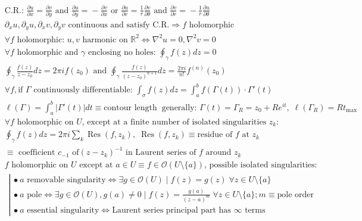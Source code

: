 \begin{align*}
&\text{C.R.: }\frac{\partial u}{\partial x}\!=\!\frac{\partial v}{\partial y}\text{ and }\frac{\partial u}{\partial y}\!=\!-\frac{\partial v}{\partial x}\text{ or }\frac{\partial u}{\partial r}\!=\!\frac{1}{r}\frac{\partial v}{\partial\theta}\text{ and }\frac{\partial v}{\partial r}\!=\!-\frac{1}{r}\frac{\partial u}{\partial\theta} \\
&\partial_x u,\partial_y u,\partial_x v,\partial_y v\text{ continuous and satisfy C.R.}\Rightarrow f\text{ holomorphic} \\
&\forall f\text{ holomorphic: }u,v\text{ harmonic on $\mathbb{R}^2$}\Leftrightarrow\nabla^2u\!=\!0,\nabla^2v\!=\!0 \\
&\forall f\text{ holomorphic and $\gamma$ enclosing no holes: }\oint_\gamma\!f(z)dz\!=\!0 \\
&\oint_\gamma\!\frac{f(z)}{z\!-\!z_0}dz\!=\!2\pi if(z_0)\text{ and }\oint_\gamma\!\frac{f(z)}{(z\!-\!z_0)^{n+1}}dz\!=\!\frac{2\pi i}{n!}f^{(n)}(z_0) \\
&\forall f,\text{if $\Gamma$ continuously differentiable: }\int_\sigma\!f(z)dz\!\!=\!\!\int_a^b\!f(\Gamma(t))\cdot\Gamma'(t) \\
&\ell(\Gamma)\!=\!\int_a^b\!|\Gamma'(t)|dt\!\equiv\!\text{contour length}\;\;\text{generally: }\!\Gamma(t)\!=\!\Gamma_R\!=\!z_0\!+\!Re^{it},\;\ell(\Gamma_R)\!=\!Rt_{\text{max}} \\
&\text{$\forall f$ holomorphic on $U$, except at a finite number of isolated singularities $z_k$:} \\
&\oint_\gamma\!f(z)dz\!=\!2\pi i\sum_k\operatorname{Res}(f,z_k),\;\operatorname{Res}(f,z_k)\!\equiv\!\text{residue of $f$ at }z_k \\
&\equiv \text{ coefficient } c_{-1} \text{ of} (z-z_k)^{-1} \text{ in Laurent series of $f$ around }z_k \\
&\text{$f$ holomorphic on $U$ except at $a \! \in \! U  \!\equiv \! f \!\in \!\mathcal{O}(U\!\setminus\!\{a\})$, possible isolated singularities:} \\
&\hspace{5pt}\left|\!\!\!
\begin{array}{l}
\bullet\ a\text{ removable singularity}\Leftrightarrow\exists g\in\mathcal{O}(U)\mid f(z)\!=\!g(z)\;\forall z\in U\setminus\{a\} \\
\bullet\ a\text{ pole}\Leftrightarrow\exists g\in\mathcal{O}(U),g(a)\!\neq\!0\mid f(z)\!=\!\frac{g(a)}{(z\!-\!a)^m}\;\forall z\in U\setminus\{a\}; m\equiv \text{pole order}\\
\bullet\ a\text{ essential singularity}\Leftrightarrow\text{Laurent series principal part has $\infty$ terms}

\end{array}
\end{align*}
